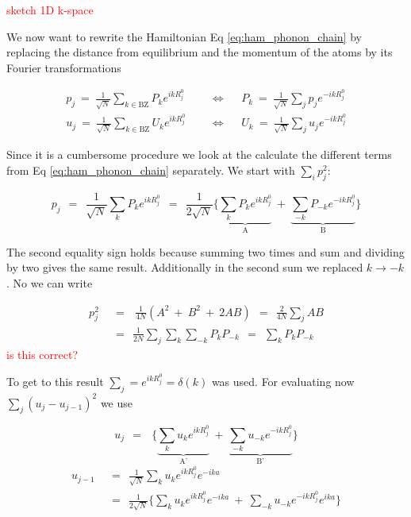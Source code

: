 \documentclass[10pt]{report}
\numberwithin{equation}{chapter}
\newcommand{\refEq}[1]{
  Eq  \ref{#1}
}
\begin{document}
\textcolor{red}{sketch 1D k-space}


We now want to rewrite the Hamiltonian \refEq{eq:ham_phonon_chain} by replacing the distance from equilibrium and the momentum of the atoms by its Fourier transformations

\begin{align}
  p_j ~=~ \frac{1}{\sqrt{N}} \sum_{k \in \text{BZ}} P_k e^{ikR^0_j} 
  ~~~~~~& \Longleftrightarrow~~~~~~
  P_k ~=~ \frac{1}{\sqrt{N}} \sum_{j} p_j e^{-ikR^0_j}\\
  u_j ~=~ \frac{1}{\sqrt{N}} \sum_{k \in \text{BZ}} U_k e^{ikR^0_j} 
  ~~~~~~& \Longleftrightarrow~~~~~~
  U_k ~=~ \frac{1}{\sqrt{N}} \sum_{j} u_j e^{-ikR^0_j}
\end{align}


Since it is a cumbersome procedure we look at the calculate the different terms from \refEq{eq:ham_phonon_chain} separately.
We start with $\sum_i p_j^2$:

\begin{equation}\label{eq:phonon_momentum}
  p_j ~~=~~ \frac{1}{\sqrt{N}} \sum_k P_k e^{ikR^0_j} ~~=~~ 
  \frac{1}{2\sqrt{N}} \bigg\{ 
  \underbrace{\sum_k P_k e^{ikR^0_j}}_\text{A} ~+~
  \underbrace{\sum_{-k} P_{-k} e^{-ikR^0_j}}_\text{B} \bigg\}
\end{equation}

The second equality sign holds because summing two times and sum and dividing by two gives the same result. Additionally in the second sum we replaced $k \rightarrow -k$. No we can write

\begin{align}\label{eq:p_squared}
  p_j^2 ~~& =~~~\frac{1}{4N} \left( A^2 ~+~ B^2 ~+~ 2AB \right)
  ~~=~~ \frac{2}{4N} \sum_j AB \nonumber \\
  ~~& =~~ \frac{1}{2N} \sum_j \sum_k \sum_{-k} P_k P_{-k}
  ~~=~~ \sum_k P_k P_{-k}
\end{align}
\textcolor{red}{is this correct?}

To get to this result $\sum_j = e^{ikR^0_j} = \delta(k)$ was used.
For evaluating now $\sum_j (u_j - u_{j-1})^2$ we use

\begin{equation}
  u_j ~~=~~~\Bigg\{ \underbrace{\sum_k u_k e^{ikR_j^0}}_\text{A'} ~+~
  \underbrace{\sum_{-k} u_{-k} e^{-ikR_j^0}}_\text{B'} \Bigg\}
\end{equation}
\begin{align}
  u_{j-1} ~~& =~~ \frac{1}{\sqrt{N}} \sum_k u_k e^{ikR_j^0} e^{-ika}\nonumber \\
  ~~& =~~ \frac{1}{2\sqrt{N}} \Bigg\{ \sum_k u_k e^{ikR_j^0} e^{-ika} ~+~
  \sum_{-k} u_{-k} e^{-ikR_j^0} e^{ika} \Bigg\}
\end{align}
\end{document}
